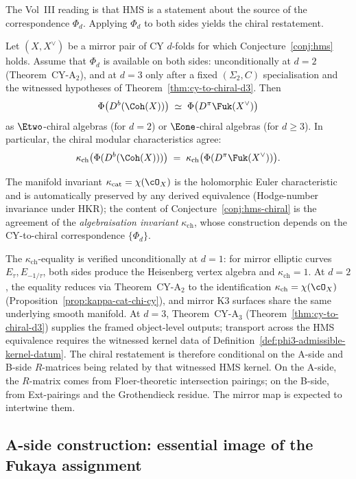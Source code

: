 The Vol~III reading is that HMS is a statement about the source of the correspondence $\Phi_d$. Applying $\Phi_d$ to both sides yields the chiral restatement.

\begin{conjecture}
\label{conj:hms-chiral}
\ClaimStatusConjectured
Let $(X, X^\vee)$ be a mirror pair of CY $d$-folds for which Conjecture~\ref{conj:hms} holds. Assume that $\Phi_d$ is available on both sides: unconditionally at $d = 2$ (Theorem~CY-A$_2$), and at $d = 3$ only after a fixed $(\Sigma_2,C)$ specialisation and the witnessed hypotheses of Theorem~\ref{thm:cy-to-chiral-d3}. Then
\[
 \Phi\bigl(D^b(\Coh(X))\bigr) \;\simeq\; \Phi\bigl(D^\pi\Fuk(X^\vee)\bigr)
\]
as $\Etwo$-chiral algebras (for $d = 2$) or $\Eone$-chiral algebras (for $d \geq 3$). In particular, the chiral modular characteristics agree:
\[
 \kappa_{\mathrm{ch}}\bigl(\Phi(D^b(\Coh(X)))\bigr) \;=\; \kappa_{\mathrm{ch}}\bigl(\Phi(D^\pi\Fuk(X^\vee))\bigr).
\]
\end{conjecture}

\noindent
The manifold invariant $\kappa_{\mathrm{cat}} = \chi(\cO_X)$ is the holomorphic Euler characteristic and is automatically preserved by any derived equivalence (Hodge-number invariance under HKR); the content of Conjecture~\ref{conj:hms-chiral} is the agreement of the \emph{algebraisation invariant} $\kappa_{\mathrm{ch}}$, whose construction depends on the CY-to-chiral correspondence $\{\Phi_d\}$.

The $\kappa_{\mathrm{ch}}$-equality is verified unconditionally at $d = 1$: for mirror elliptic curves $E_\tau, E_{-1/\tau}$, both sides produce the Heisenberg vertex algebra and $\kappa_{\mathrm{ch}} = 1$. At $d = 2$, the equality reduces via Theorem~CY-A$_2$ to the identification $\kappa_{\mathrm{ch}} = \chi(\cO_X)$ (Proposition~\ref{prop:kappa-cat-chi-cy}), and mirror K3 surfaces share the same underlying smooth manifold. At $d = 3$, Theorem~CY-A$_3$ (Theorem~\ref{thm:cy-to-chiral-d3}) supplies the framed object-level outputs; transport across the HMS equivalence requires the witnessed kernel data of Definition~\ref{def:phi3-admissible-kernel-datum}. The chiral restatement is therefore conditional on the A-side and B-side $R$-matrices being related by that witnessed HMS kernel. On the A-side, the $R$-matrix comes from Floer-theoretic intersection pairings; on the B-side, from Ext-pairings and the Grothendieck residue. The mirror map is expected to intertwine them.

\subsection{A-side construction: essential image of the Fukaya assignment}
\label{subsec:phi3-ach-essential-image}

